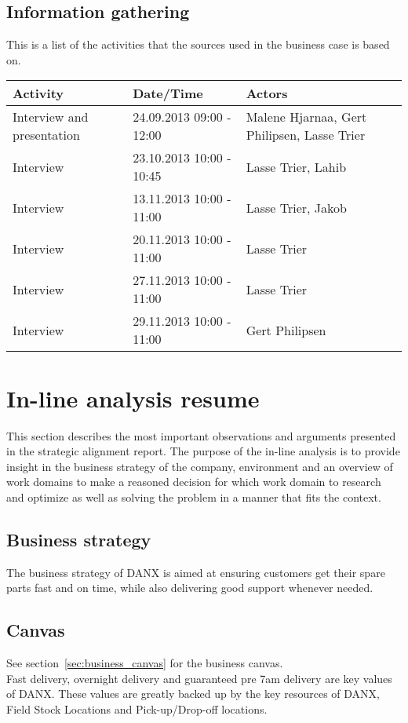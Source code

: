 \subsection{Information gathering}
This is a list of the activities that the sources used in the business case is based on.

\vspace{2mm}
\begin{tabular}{ | p{3.3cm} || p{4.5cm} | p{4.5cm} | }
\hline
\rowcolor{GR}
\textbf{Activity} & \textbf{Date/Time} & \textbf{Actors}\\ \hline \hline
Interview and presentation & 24.09.2013 09:00 - 12:00 & Malene Hjarnaa, Gert Philipsen, Lasse Trier \\ \hline
Interview & 23.10.2013 10:00 - 10:45 & Lasse Trier, Lahib \\ \hline
Interview & 13.11.2013 10:00 - 11:00 & Lasse Trier, Jakob \\ \hline
Interview & 20.11.2013 10:00 - 11:00 & Lasse Trier \\ \hline
Interview & 27.11.2013 10:00 - 11:00 & Lasse Trier \\ \hline
Interview & 29.11.2013 10:00 - 11:00 & Gert Philipsen \\ \hline
\end{tabular}

\section{In-line analysis resume}
This section describes the most important observations and arguments presented in the strategic alignment report. The purpose of the in-line analysis is to provide insight in the business strategy of the company, environment and an overview of work domains to make a reasoned decision for which work domain to research and optimize as well as solving the problem in a manner that fits the context.

\subsection{Business strategy}
The business strategy of DANX is aimed at ensuring customers get their spare parts fast and on time, while also delivering good support whenever needed.\cite{gert027}\cite{gert025}\cite{lasse012}

\subsection{Canvas}
See section~\ref{sec:business_canvas} for the business canvas.\\
Fast delivery, overnight delivery and guaranteed pre 7am\cite{gert001} delivery are key values of DANX. These values are greatly backed up by the key resources of DANX, Field Stock Locations and Pick-up/Drop-off locations.\cite{img001}

